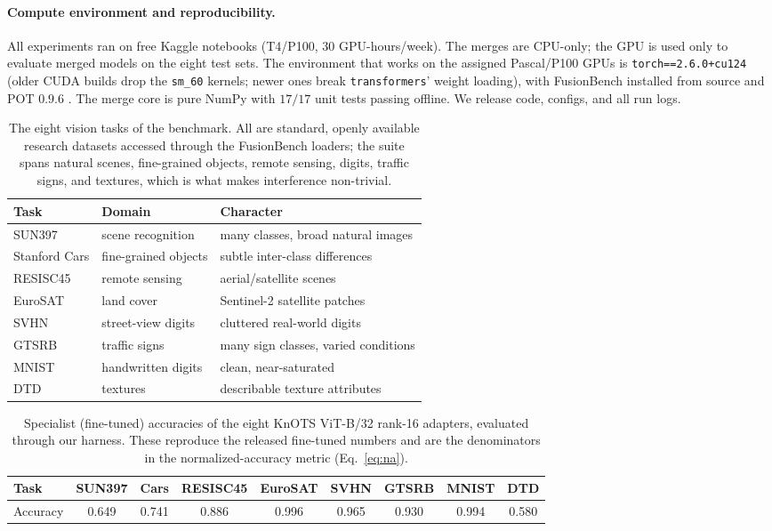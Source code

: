 \documentclass[11pt]{article}
\begin{document}
\paragraph{Compute environment and reproducibility.}
All experiments ran on free Kaggle notebooks (T4/P100, 30 GPU-hours/week). The merges are CPU-only; the
GPU is used only to evaluate merged models on the eight test sets. The environment that works on the
assigned Pascal/P100 GPUs is \texttt{torch==2.6.0+cu124} (older CUDA builds drop the \texttt{sm\_60}
kernels; newer ones break \texttt{transformers}' weight loading), with FusionBench installed from source
and POT $0.9.6$ \citep{flamary2021pot}. The merge core is pure NumPy with $17/17$ unit tests passing
offline. We release code, configs, and all run logs.

\begin{table}[t]
\centering
\caption{The eight vision tasks of the benchmark. All are standard, openly available research datasets
accessed through the FusionBench loaders; the suite spans natural scenes, fine-grained objects, remote
sensing, digits, traffic signs, and textures, which is what makes interference non-trivial.}
\label{tab:datasets}
\small
\begin{tabular}{lll}
\toprule
Task & Domain & Character \\
\midrule
SUN397 & scene recognition & many classes, broad natural images \\
Stanford Cars & fine-grained objects & subtle inter-class differences \\
RESISC45 & remote sensing & aerial/satellite scenes \\
EuroSAT & land cover & Sentinel-2 satellite patches \\
SVHN & street-view digits & cluttered real-world digits \\
GTSRB & traffic signs & many sign classes, varied conditions \\
MNIST & handwritten digits & clean, near-saturated \\
DTD & textures & describable texture attributes \\
\bottomrule
\end{tabular}
\end{table}

\begin{table}[t]
\centering
\caption{Specialist (fine-tuned) accuracies of the eight KnOTS ViT-B/32 rank-16 adapters, evaluated
through our harness. These reproduce the released fine-tuned numbers and are the denominators in the
normalized-accuracy metric (Eq.~\eqref{eq:na}).}
\label{tab:specialists}
\small
\begin{tabular}{lcccccccc}
\toprule
Task & SUN397 & Cars & RESISC45 & EuroSAT & SVHN & GTSRB & MNIST & DTD \\
\midrule
Accuracy & 0.649 & 0.741 & 0.886 & 0.996 & 0.965 & 0.930 & 0.994 & 0.580 \\
\bottomrule
\end{tabular}
\end{table}
\end{document}
